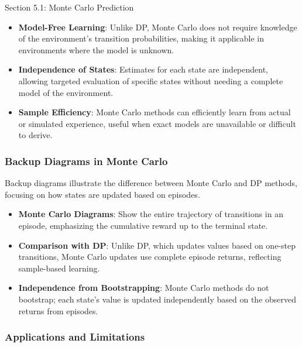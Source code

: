 \begin{notes}{Section 5.1: Monte Carlo Prediction}
\begin{highlight}
        \begin{itemize}
            \item \textbf{Model-Free Learning}: Unlike DP, Monte Carlo does not require knowledge of the environment's transition probabilities, making it applicable in environments where the model is unknown.
            \item \textbf{Independence of States}: Estimates for each state are independent, allowing targeted evaluation of specific states without needing a complete model of the environment.
            \item \textbf{Sample Efficiency}: Monte Carlo methods can efficiently learn from actual or simulated experience, useful when exact models are unavailable or difficult to derive.
        \end{itemize}
    
    \end{highlight}
    
    \subsubsection*{Backup Diagrams in Monte Carlo}
    
    Backup diagrams illustrate the difference between Monte Carlo and DP methods, focusing on how states are updated based on episodes.
    
    \begin{highlight}
    
        \begin{itemize}
            \item \textbf{Monte Carlo Diagrams}: Show the entire trajectory of transitions in an episode, emphasizing the cumulative reward up to the terminal state.
            \item \textbf{Comparison with DP}: Unlike DP, which updates values based on one-step transitions, Monte Carlo updates use complete episode returns, reflecting sample-based learning.
            \item \textbf{Independence from Bootstrapping}: Monte Carlo methods do not bootstrap; each state's value is updated independently based on the observed returns from episodes.
        \end{itemize}
    
    \end{highlight}
    
    \subsubsection*{Applications and Limitations}
    

\end{notes}
